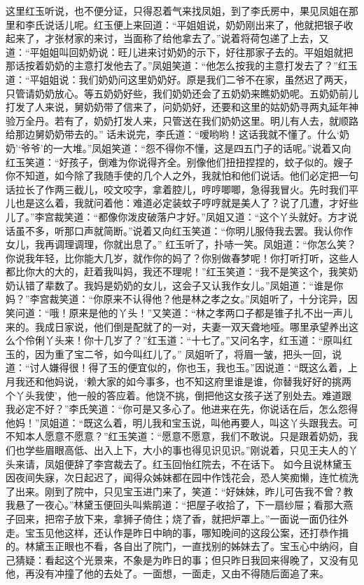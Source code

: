 \documentclass[12pt,oneside]{book}
\begin{document}
这里红玉听说，也不便分证，只得忍着气来找凤姐，到了李氏房中，果见凤姐在那里和李氏说话儿呢。红玉便上来回道：“平姐姐说，奶奶刚出来了，他就把银子收起来了，才张材家的来讨，当面称了给他拿去了。”说着将荷包递了上去，又道：“平姐姐叫回奶奶说：旺儿进来讨奶奶的示下，好往那家子去的。平姐姐就把那话按着奶奶的主意打发他去了。”凤姐笑道：“他怎么按我的主意打发去了？”红玉道：“平姐姐说：我们奶奶问这里奶奶好。原是我们二爷不在家，虽然迟了两天，只管请奶奶放心。等五奶奶好些，我们奶奶还会了五奶奶来瞧奶奶呢。五奶奶前儿打发了人来说，舅奶奶带了信来了，问奶奶好，还要和这里的姑奶奶寻两丸延年神验万全丹。若有了，奶奶打发人来，只管送在我们奶奶这里。明儿有人去，就顺路给那边舅奶奶带去的。”
话未说完，李氏道：“嗳哟哟！这话我就不懂了。什么‘奶奶’‘爷爷’的一大堆。”凤姐笑道：“怨不得你不懂，这是四五门子的话呢。”说着又向红玉笑道：“好孩子，倒难为你说得齐全。别像他们扭扭捏捏的，蚊子似的。嫂子你不知道，如今除了我随手使的几个人之外，我就怕和他们说话。他们必定把一句话拉长了作两三截儿，咬文咬字，拿着腔儿，哼哼唧唧，急得我冒火。先时我们平儿也是这么着，我就问着他：难道必定装蚊子哼哼就是美人了？说了几遭，才好些儿了。”李宫裁笑道：“都像你泼皮破落户才好。”凤姐又道：“这个丫头就好。方才说话虽不多，听那口声就简断。”说着又向红玉笑道：“你明儿服侍我去罢。我认你作女儿，我再调理调理，你就出息了。”
红玉听了，扑哧一笑。凤姐道：“你怎么笑？你说我年轻，比你能大几岁，就作你的妈了？你别做春梦呢！你打听打听，这些人都比你大的大的，赶着我叫妈，我还不理呢！”红玉笑道：“我不是笑这个，我笑奶奶认错了辈数了。我妈是奶奶的女儿，这会子又认我作女儿。”凤姐道：“谁是你妈？”李宫裁笑道：“你原来不认得他？他是林之孝之女。”凤姐听了，十分诧异，因笑问道：“哦！原来是他的丫头！”又笑道：“林之孝两口子都是锥子扎不出一声儿来的。我成日家说，他们倒是配就了的一对，夫妻一双天聋地哑。哪里承望养出这么个伶俐丫头来！你十几岁了？”红玉道：“十七了。”又问名字，红玉道：“原叫红玉的，因为重了宝二爷，如今叫红儿了。”
凤姐听了，将眉一皱，把头一回，说道：“讨人嫌得很！得了玉的便宜似的，你也玉，我也玉。”因说道：“既这么着，上月我还和他妈说，‘赖大家的如今事多，也不知这府里谁是谁，你替我好好的挑两个丫头我使’，他一般的答应着。他饶不挑，倒把他这女孩子送了别处去。难道跟我必定不好？”李氏笑道：“你可是又多心了。他进来在先，你说话在后，怎么怨得他妈！”凤姐道：“既这么着，明儿我和宝玉说，叫他再要人，叫这丫头跟我去。可不知本人愿意不愿意？”红玉笑道：“愿意不愿意，我们不敢说。只是跟着奶奶，我们也学些眉眼高低、出入上下，大小的事也得见识见识。”刚说着，只见王夫人的丫头来请，凤姐便辞了李宫裁去了。红玉回怡红院去，不在话下。
如今且说林黛玉因夜间失寐，次日起迟了，闻得众姊妹都在园中作饯花会，恐人笑痴懒，连忙梳洗了出来。刚到了院中，只见宝玉进门来了，笑道：“好妹妹，昨儿可告我不曾？教我悬了一夜心。”林黛玉便回头叫紫鹃道：“把屋子收拾了，下一扇纱屉；看那大燕子回来，把帘子放下来，拿狮子倚住；烧了香，就把炉罩上。”一面说一面仍往外走。宝玉见他这样，还认作是昨日中晌的事，哪知晚间的这段公案，还打恭作揖的。林黛玉正眼也不看，各自出了院门，一直找别的姊妹去了。宝玉心中纳闷，自己猜疑：看起这个光景来，不象是为昨日的事；但只昨日我回来得晚了，又没有见他，再没有冲撞了他的去处了。一面想，一面走，又由不得随后面追了来。
\end{document}
